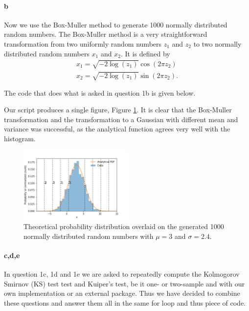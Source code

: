 \paragraph{b}
Now we use the Box-Muller method to generate 1000 normally distributed random numbers. The Box-Muller method is a very straightforward transformation from two uniformly random numbers $z_1$ and $z_2$ to two normally distributed random numbers $x_1$ and $x_2$. It is defined by
\begin{equation}
\begin{split}
    x_1 = \sqrt{-2\log(z_1)} \cos(2\pi z_2) \\
    x_2 = \sqrt{-2\log(z_1)} \sin(2\pi z_2).
\end{split}
\end{equation}

The code that does what is asked in question 1b is given below.


Our script produces a single figure, Figure \ref{fig:fig4}. It is clear that the Box-Muller transformation and the transformation to a Gaussian with different mean and variance was successful, as the analytical function agrees very well with the histogram.

\begin{figure}[ht]
    \centering
    \includegraphics[width=0.5\textwidth]{./plots/q1b1.png}
    \captionsetup{width=0.8\textwidth}
    \caption{Theoretical probability distribution overlaid on the generated 1000 normally distributed random numbers with $\mu=3$ and $\sigma=2.4$.}
    \label{fig:fig4}
\end{figure}


\paragraph{c,d,e}
In question 1c, 1d and 1e we are asked to repeatedly compute the Kolmogorov Smirnov (KS) test test and Kuiper's test, be it one- or two-sample and with our own implementation or an external package. Thus we have decided to combine these questions and answer them all in the same for loop and thus piece of code. 

